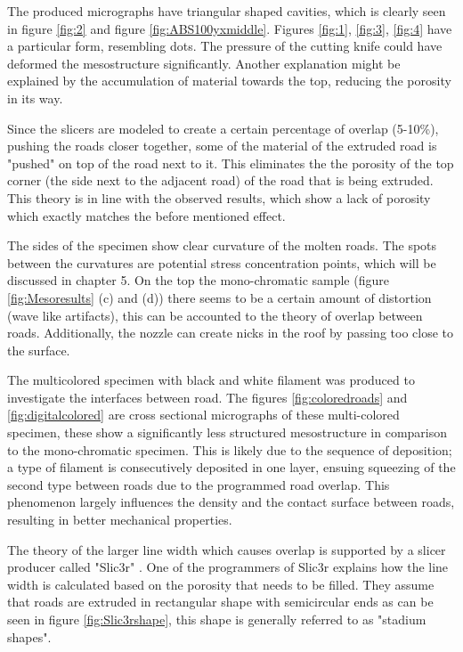 The produced micrographs have triangular shaped cavities, which is clearly seen in figure \ref{fig:2} and figure \ref{fig:ABS100yxmiddle}. Figures \ref{fig:1}, \ref{fig:3}, \ref{fig:4} have a particular form, resembling dots. The pressure of the cutting knife could have deformed the mesostructure significantly. Another explanation might be explained by the accumulation of material towards the top, reducing the porosity in its way. 

Since the slicers are  modeled to create a certain percentage of overlap (5-10\%), pushing the roads closer together, some of the material of the extruded road is "pushed" on top of the road next to it. This eliminates the the porosity of the top corner (the side next to the adjacent road) of the road that is being extruded. This theory is in line with the observed results, which show a lack of porosity which exactly matches the before mentioned effect. 

The sides of the specimen show clear curvature of the molten roads. The spots between the curvatures are potential stress concentration points, which will be discussed in chapter 5.
On the top the mono-chromatic sample (figure \ref{fig:Mesoresults} (c) and (d)) there seems to be a certain amount of distortion (wave like artifacts), this can be accounted to the theory of overlap between roads. Additionally, the nozzle can create nicks in the roof by passing too close to the surface.

The multicolored specimen with black and white filament was produced to investigate the interfaces between road. The figures \ref{fig:coloredroads} and \ref{fig:digitalcolored} are cross sectional micrographs of these multi-colored specimen, these show a significantly less structured mesostructure in comparison to the mono-chromatic specimen. This is likely due to the sequence of deposition; a type of filament is consecutively deposited in one layer,  ensuing squeezing of the second type between roads due to the programmed road overlap. This phenomenon largely influences the density and the contact surface between roads, resulting in better mechanical properties.

The theory of the larger line width which causes overlap is supported by a slicer producer called "Slic3r" \cite{GaryHodgsonSlic3rMath}. One of the programmers of Slic3r explains how the line width is calculated based on the porosity that needs to be filled. They assume that roads are extruded in rectangular shape with  semicircular ends as can be seen in figure \ref{fig:Slic3rshape}, this shape is generally referred to as "stadium shapes".

